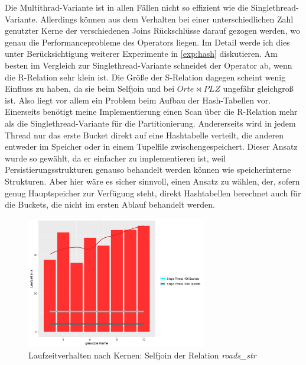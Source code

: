 \documentclass[a4paper,12pt,twoside]{article}
\newcommand{\Fb}[1]{\textit{#1}} %
\begin{document}
Die Multithrad-Variante ist in allen Fällen nicht so effizient wie die Singlethread-Variante. Allerdings können aus dem Verhalten bei einer unterschiedlichen Zahl genutzter Kerne der verschiedenen Joins Rückschlüsse darauf gezogen werden, wo genau die Performanceprobleme des Operators liegen. Im Detail werde ich dies unter Berücksichtigung weiterer Experimente in \autoref{exp:hash} diskutieren. Am besten im Vergleich zur Singlethread-Variante schneidet der Operator ab, wenn die R-Relation sehr klein ist. Die Größe der S-Relation dagegen scheint wenig Einfluss zu haben, da sie beim Selfjoin und bei $Orte \bowtie PLZ$ ungefähr gleichgroß ist. Also liegt vor allem ein Problem beim Aufbau der Hash-Tabellen vor. Einerseits benötigt meine Implementierung einen Scan über die R-Relation mehr als die Singlethread-Variante für die Partitionierung. Andererseits wird in jedem Thread nur das erste Bucket direkt auf eine Hashtabelle verteilt, die anderen entweder im Speicher oder in einem Tupelfile zwischengespeichert. Dieser Ansatz wurde so gewählt, da er einfacher zu implementieren ist, weil Persistierungsstrukturen genauso behandelt werden können wie speicherinterne Strukturen. Aber hier wäre es sicher sinnvoll, einen Ansatz zu wählen, der, sofern genug Hauptspeicher zur Verfügung steht, direkt Hashtabellen berechnet auch für die Buckets, die nicht im ersten Ablauf behandelt werden. 

\begin{figure}
	\centering
	\includegraphics[width=0.7\textwidth]{Bilder/join_kerne_self.png}
	\caption{Laufzeitverhalten nach Kernen: Selfjoin der Relation \Fb{roads\_str}}
	\label{img:joinKern}
\end{figure}
\end{document}
